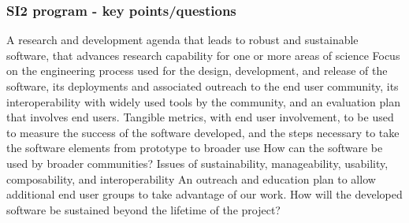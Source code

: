 \begin{frame}
\frametitle{SI2 program - key points/questions}


\footnotesize{
A research and development agenda that leads to robust and sustainable software, that advances research capability for one or more areas of science 
\vskip 0.12in
Focus on the engineering process used for the design, development, and release of the software, its deployments and associated outreach to the end user community, its interoperability with widely used tools by the community, and an evaluation plan that involves end users.
\vskip 0.12in
Tangible metrics, with end user involvement, to be used to measure the success of the software developed, and the steps necessary to take the software elements from prototype to broader use
\vskip 0.12in
How can the software be used by broader communities? 
\vskip 0.12in
Issues of sustainability, manageability, usability, composability, and interoperability 
\vskip 0.12in
An outreach and education plan to allow additional end user groups to take advantage of our work.
\vskip 0.12in
How will the developed software be sustained beyond the lifetime of the project?
}

\end{frame}


